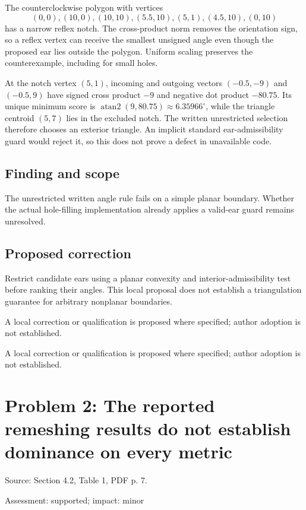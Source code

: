 \documentclass[11pt]{article}
\begin{document}
The counterclockwise polygon with vertices \[(0,0),(10,0),(10,10),(5.5,10),(5,1),(4.5,10),(0,10)\] has a narrow reflex notch. The cross-product norm removes the orientation sign, so a reflex vertex can receive the smallest unsigned angle even though the proposed ear lies outside the polygon. Uniform scaling preserves the counterexample, including for small holes.

At the notch vertex \((5,1)\), incoming and outgoing vectors \((-0.5,-9)\) and \((-0.5,9)\) have signed cross product \(-9\) and negative dot product \(-80.75\). Its unique minimum score is \(\operatorname{atan2}(9,80.75)\approx6.35966^\circ\), while the triangle centroid \((5,7)\) lies in the excluded notch. The written unrestricted selection therefore chooses an exterior triangle. An implicit standard ear-admissibility guard would reject it, so this does not prove a defect in unavailable code.

\subsection*{Finding and scope}

The unrestricted written angle rule fails on a simple planar boundary. Whether the actual hole-filling implementation already applies a valid-ear guard remains unresolved.

\subsection*{Proposed correction}

Restrict candidate ears using a planar convexity and interior-admissibility test before ranking their angles. This local proposal does not establish a triangulation guarantee for arbitrary nonplanar boundaries.

A local correction or qualification is proposed where specified; author adoption is not established.

A local correction or qualification is proposed where specified; author adoption is not established.

\section*{Problem 2: The reported remeshing results do not establish dominance on every metric}

Source: Section 4.2, Table 1, PDF p. 7.

Assessment: supported; impact: minor
\end{document}
